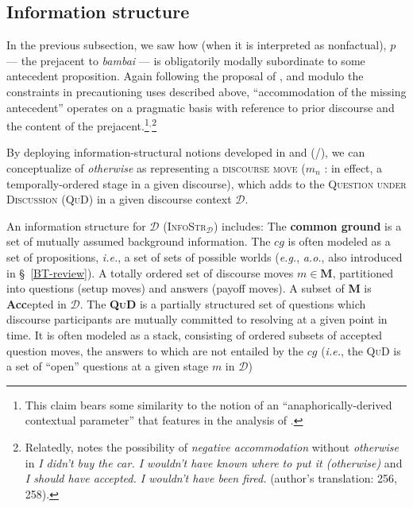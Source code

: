 \subsection{Information structure}\label{infstr}



In the previous subsection, we saw how (when it is interpreted as nonfactual), $ p $ --- the prejacent to \textit{bambai} --- is obligatorily modally subordinate to some antecedent proposition. Again following the proposal of \cite{PhilKotek}, and modulo the constraints in precautioning uses described above, ``accommodation of the missing antecedent'' operates on a pragmatic basis with reference to prior discourse  and the content of the prejacent.\footnote{This claim bears some similarity to the notion of an ``anaphorically-derived contextual parameter'' that features in the analysis of \citet[14]{Webber2001}.}$ ^, $\footnote{Relatedly, \citet{Corblin2002} notes the possibility of \textit{negative accommodation} without \textit{otherwise} in \textit{I didn't buy the car. I wouldn't have known where to put it (otherwise)} and \textit{I should have accepted. I wouldn't have been fired.} (author's translation: 256, 258).\label{corblin-modsub-note}}

By deploying information-structural notions developed in \citet{Carlson1983} and \citeauthor{Roberts1996a} (\citeyear{Roberts1996a}/\citeyear{Roberts2012}), we can conceptualize of \textit{otherwise} as representing a \textsc{discourse move} ($ m_n $ : in effect, a temporally-ordered stage in a given discourse), which adds to the \textsc{Question under Discussion (QuD)} in a given discourse context $ \mathcal D $.

\pex An information structure for $ \mathcal D $ (\textsc{InfoStr}$ _\mathcal D $) includes:
\a The \textbf{common ground} is a set of mutually assumed background information. The $cg$ is often modeled as a set of propositions, \textit{i.e.},  a set of sets of possible worlds (\textit{e.g.}, \citealt{Stalnaker1978} \textit{a.o.}, also introduced in \S~\ref{BT-review}). \label{common-ground}
\a A totally ordered set of discourse moves $ m\in\mathbf{M} $, partitioned into questions (setup moves) and answers (payoff moves). A subset of \textbf{M} is \textbf{Acc}epted in $ \mathcal D $.
\a The \textbf{\textsc{QuD}} is a partially structured set of questions which discourse participants are mutually committed to resolving at a given point in time. It is often modeled as a stack, consisting of ordered subsets of accepted question moves, the answers to which are not entailed by the $cg$ (\textit{i.e.}, the \textsc{QuD} is a set of ``open'' questions at a given stage $ m $ in $ \mathcal D $)\xe 


